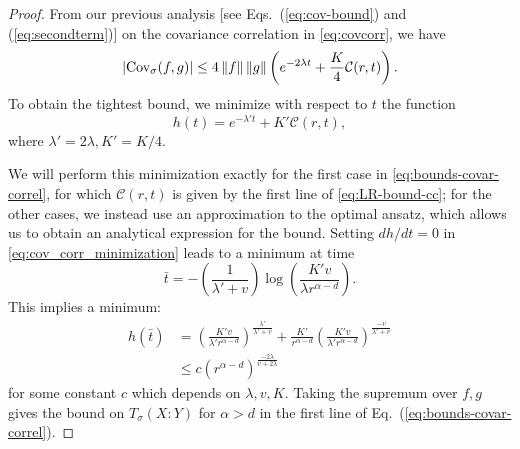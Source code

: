 \begin{proof}
From our previous analysis [see Eqs.~(\ref{eq:cov-bound}) and (\ref{eq:secondterm})] on the covariance correlation in \cref{eq:covcorr}, we have
\begin{equation}
|\text{Cov}_\sigma (f, g)| \leq 4 \left\|f\right\| \left\|g\right\|  \left(e^{-2 \lambda t} + \frac K4 \mathcal{C}(r, t) \right).
\end{equation}
To obtain the tightest bound, we  minimize with respect to $t$ the function
\begin{equation}
\label{eq:cov_corr_minimization}
h(t) =   e^{-\lambda' t} + K' \mathcal{C}(r, t),
\end{equation}
where $\lambda' = 2\lambda, K'= K/4$.

We will perform this minimization exactly for the first case in \cref{eq:bounds-covar-correl}, for which $\mathcal{C}(r,t)$ is given by the first line of \cref{eq:LR-bound-cc}; for the other cases, we instead use an approximation to the optimal ansatz, which allows us to obtain an analytical expression for the bound.
Setting $dh/dt=0$ in \cref{eq:cov_corr_minimization} leads to a minimum at time
\begin{equation}
\bar{t} = -\left( \frac{1}{\lambda'+v} \right) \log \left(  \frac{ K' v }{ \lambda r^{\alpha-d}} \right).
\end{equation}
This implies a minimum:
\begin{align}
h(\bar{t}) &= \left( \frac{K' v}{\lambda' r^{\alpha - d}} \right)^{\frac{\lambda'}{ \lambda' + v}} + \frac{K'}{r^{\alpha - d}}  \left( \frac{K' v} {\lambda' r^{\alpha - d}} \right)^{\frac{-v }{ \lambda' + v }} \nonumber \\
&\leq  c  \left( r^{\alpha - d} \right)^{\frac{-2 \lambda}{ v + 2\lambda}}
\end{align}
for some constant $c$ which depends on $\lambda, v, K$.
Taking the supremum over $f,g$ gives the bound on $T_\sigma (X:Y) $ for $\alpha > d$ in the first line of Eq.~(\ref{eq:bounds-covar-correl}).


\end{proof}
